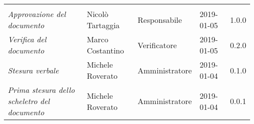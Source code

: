 \newpage 
\section*{}
\begin{table}[H]
	\centering
	\begin{tabular}{p{4cm}|C{3cm}|C{3cm}|R{2.5cm}|R{2cm}}
		
		 & & & & \\
		
		
		\emph{Approvazione del documento} &  Nicolò Tartaggia & Responsabile & 2019-01-05 & 1.0.0 \\
		\hline
		
		\emph{Verifica del documento} & Marco Costantino & Verificatore & 2019-01-05 & 0.2.0 \\
		\hline

		\emph{Stesura verbale} & Michele Roverato & Amministratore & 2019-01-04 & 0.1.0 \\
		\hline
		
		\emph{Prima stesura dello scheletro del documento} & Michele Roverato & Amministratore & 2019-01-04 & 0.0.1 \\
		
	\end{tabular}
	
\end{table}


\clearpage